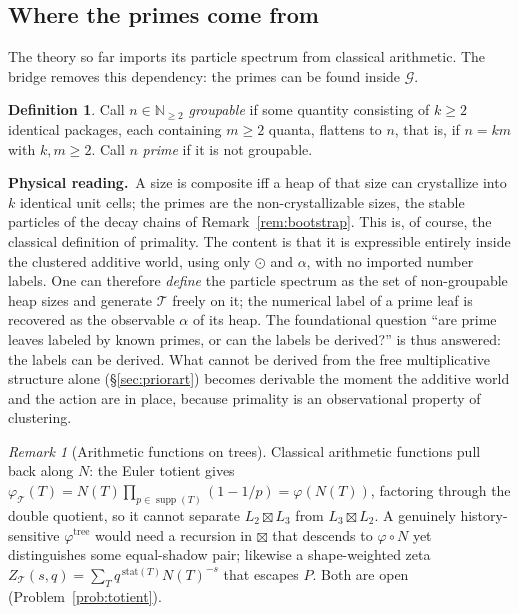 \documentclass[11pt]{article}
\newcommand{\cT}{\mathcal{T}}   %
\newcommand{\cG}{\mathcal{G}}   %
\newcommand{\NN}{\mathbb{N}}
\newcommand{\physread}{\medskip\noindent\textbf{Physical reading.}\ }
\DeclareMathOperator{\supp}{supp}
\numberwithin{equation}{section}
\theoremstyle{plain}
\theoremstyle{definition}
\newtheorem{definition}[theorem]{Definition}
\theoremstyle{remark}
\newtheorem{remark}[theorem]{Remark}
\begin{document}
\subsection{Where the primes come from}\label{sec:primesfrom}

The theory so far imports its particle spectrum from classical arithmetic. The bridge
removes this dependency: the primes can be found inside $\cG$.

\begin{definition}\label{def:groupable}
Call $n \in \NN_{\ge 2}$ \emph{groupable} if some quantity consisting of $k \ge 2$
identical packages, each containing $m \ge 2$ quanta, flattens to $n$, that is, if
$n = km$ with $k, m \ge 2$. Call $n$ \emph{prime} if it is not groupable.
\end{definition}

\physread A size is composite iff a heap of that size can crystallize into $k$
identical unit cells; the primes are the non-crystallizable sizes, the stable
particles of the decay chains of Remark~\ref{rem:bootstrap}. This is, of course, the
classical definition of primality. The content is that it is expressible entirely
inside the clustered additive world, using only $\odot$ and $\alpha$, with no imported
number labels. One can therefore \emph{define} the particle spectrum as the set of
non-groupable heap sizes and generate $\cT$ freely on it; the numerical label of a
prime leaf is recovered as the observable $\alpha$ of its heap. The foundational question
``are prime leaves labeled by known primes, or can the labels be derived?'' is thus
answered: the labels can be derived. What cannot be derived from the free multiplicative structure alone
(\S\ref{sec:priorart}) becomes derivable the moment the additive world and the action
are in place, because primality is an observational property of clustering.

\begin{remark}[Arithmetic functions on trees]\label{rem:functions}
Classical arithmetic functions pull back along $N$: the Euler totient gives
$\varphi_\cT(T) = N(T)\prod_{p\in\supp(T)}(1 - 1/p) = \varphi(N(T))$, factoring
through the double quotient, so it cannot separate $L_2\boxtimes L_3$ from
$L_3\boxtimes L_2$. A genuinely history-sensitive $\varphi^{\mathrm{tree}}$ would need
a recursion in $\boxtimes$ that descends to $\varphi\circ N$ yet distinguishes some
equal-shadow pair; likewise a shape-weighted zeta
$Z_\cT(s, q) = \sum_T q^{\,\mathrm{stat}(T)} N(T)^{-s}$ that escapes $P$. Both are open
(Problem~\ref{prob:totient}).
\end{remark}
\end{document}
